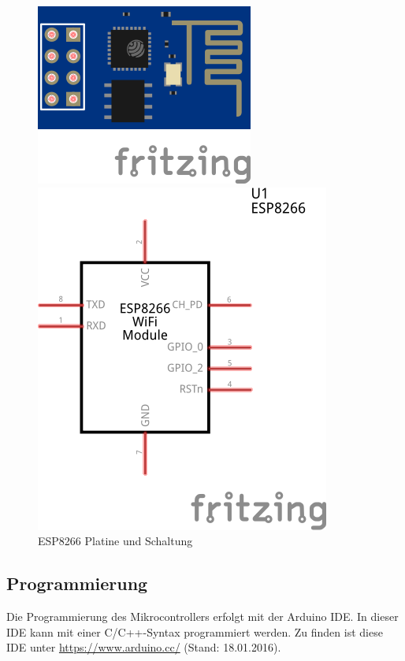 \begin{figure}
	\centering
	\begin{minipage}{0.45\textwidth}
			\includegraphics[scale=1.5]{Abbildungen/ESP8266A}
	\end{minipage}
	\hfill
	\begin{minipage}{0.45\textwidth} 
			\includegraphics[scale=1.5]{Abbildungen/ESP8266}
	\end{minipage}
	\caption{ESP8266 Platine und Schaltung}
	\label{fig:ESP8266}
\end{figure}

\subsection{Programmierung}
Die Programmierung des Mikrocontrollers erfolgt mit der Arduino IDE.
In dieser IDE kann mit einer C/C++-Syntax programmiert werden.
Zu finden ist diese IDE unter \url{https://www.arduino.cc/} (Stand: 18.01.2016).

